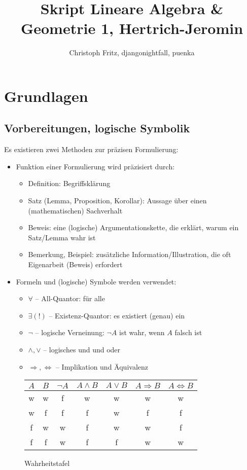 \documentclass[12pt,a4paper,parskip=half-,DIV=15]{scrreprt}
\author{Christoph Fritz, djangonightfall, puenka}
\title{Skript Lineare Algebra \& Geometrie 1, Hertrich-Jeromin}
\begin{document}
\maketitle
\tableofcontents

\chapter{Grundlagen}

\section{Vorbereitungen, logische Symbolik}
Es existieren zwei Methoden zur präzisen Formulierung:
\begin{itemize}
\item Funktion einer Formulierung wird präzisiert durch:
	\begin{itemize}
	\item Definition: Begriffsklärung
	\item Satz (Lemma, Proposition, Korollar): Aussage über einen (mathematischen) Sachverhalt
	\item Beweis: eine (logische) Argumentationskette, die erklärt, warum ein Satz/Lemma wahr ist
	\item Bemerkung, Beispiel: zusätzliche Information/Illustration, die oft Eigenarbeit (Beweis) erfordert
	\end{itemize}
\item Formeln und (logische) Symbole werden verwendet:
	\begin{itemize}
	\item $\forall$ -- All-Quantor: \glqq für alle\grqq
	\item $\exists(!)$ -- Existenz-Quantor: \glqq es existiert (genau) ein\grqq
	\item $\lnot$ -- logische Verneinung: $\lnot A$ ist wahr, wenn $A$ falsch ist
	\item $\land ,\lor$ -- logisches \glqq und\grqq{} und \glqq oder\grqq
	\item $\Rightarrow ,\Leftrightarrow$ -- Implikation und Äquivalenz
	\end{itemize}
\end{itemize}

\begin{figure}[H]\centering
\begin{tabular}{c|c|c|c|c|c|c}
$A$ & $B$ & $\lnot A$ & $A\land B$ &$A\lor B$&$A \Rightarrow B$ & $A\Leftrightarrow B$\\\hline
w & w & f & w & w & w & w\\
w & f & f & f & w & f & f\\
f & w & w & f & w & w & f\\
f & f & w & f & f & w & w\\
\end{tabular}
\caption{Wahrheitstafel}
\end{figure}
\end{document}
